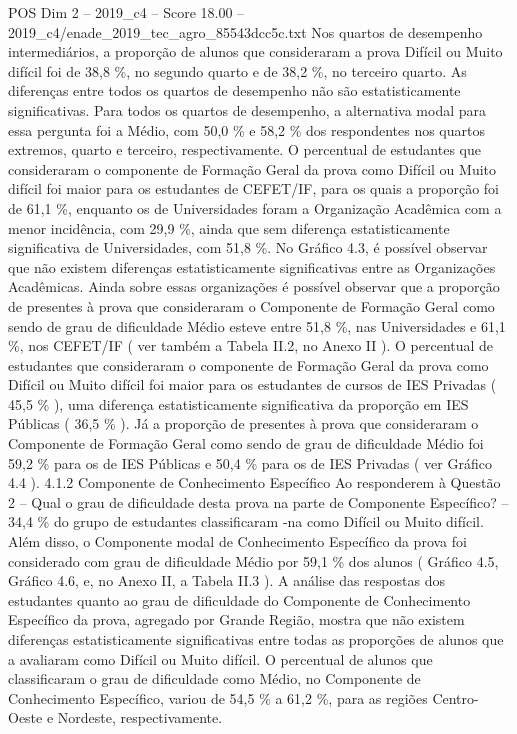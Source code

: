\begin{textsample}{POS Dim 2 – 2019\_c4 – Score 18.00 – 2019\_c4/enade\_2019\_tec\_agro\_85543dcc5c.txt}
Nos quartos de desempenho intermediários, a proporção de alunos que consideraram a prova Difícil ou Muito difícil foi de 38,8 \%, no segundo quarto e de 38,2 \%, no terceiro quarto.
As diferenças entre todos os quartos de desempenho não são estatisticamente significativas.
Para todos os quartos de desempenho, a alternativa modal para essa pergunta foi a Médio, com 50,0 \% e 58,2 \% dos respondentes nos quartos extremos, quarto e terceiro, respectivamente.
O percentual de estudantes que consideraram o componente de Formação Geral da prova como Difícil ou Muito difícil foi maior para os estudantes de CEFET/IF, para os quais a proporção foi de 61,1 \%, enquanto os de Universidades foram a Organização Acadêmica com a menor incidência, com 29,9 \%, ainda que sem diferença estatisticamente significativa de Universidades, com 51,8 \%.
No Gráfico 4.3, é possível observar que não existem diferenças estatisticamente significativas entre as Organizações Acadêmicas.
Ainda sobre essas organizações é possível observar que a proporção de presentes à prova que consideraram o Componente de Formação Geral como sendo de grau de dificuldade Médio esteve entre 51,8 \%, nas Universidades e 61,1 \%, nos CEFET/IF ( ver também a Tabela II.2, no Anexo II ).
O percentual de estudantes que consideraram o componente de Formação Geral da prova como Difícil ou Muito difícil foi maior para os estudantes de cursos de IES Privadas ( 45,5 \% ), uma diferença estatisticamente significativa da proporção em IES Públicas ( 36,5 \% ).
Já a proporção de presentes à prova que consideraram o Componente de Formação Geral como sendo de grau de dificuldade Médio foi 59,2 \% para os de IES Públicas e 50,4 \% para os de IES Privadas ( ver Gráfico 4.4 ). 4.1.2 Componente de Conhecimento Específico Ao responderem à Questão 2 – Qual o grau de dificuldade desta prova na parte de Componente Específico? – 34,4 \% do grupo de estudantes classificaram -na como Difícil ou Muito difícil.
Além disso, o Componente modal de Conhecimento Específico da prova foi considerado com grau de dificuldade Médio por 59,1 \% dos alunos ( Gráfico 4.5, Gráfico 4.6, e, no Anexo II, a Tabela II.3 ).
A análise das respostas dos estudantes quanto ao grau de dificuldade do Componente de Conhecimento Específico da prova, agregado por Grande Região, mostra que não existem diferenças estatisticamente significativas entre todas as proporções de alunos que a avaliaram como Difícil ou Muito difícil.
O percentual de alunos que classificaram o grau de dificuldade como Médio, no Componente de Conhecimento Específico, variou de 54,5 \% a 61,2 \%, para as regiões Centro-Oeste e Nordeste, respectivamente.

\end{textsample}

